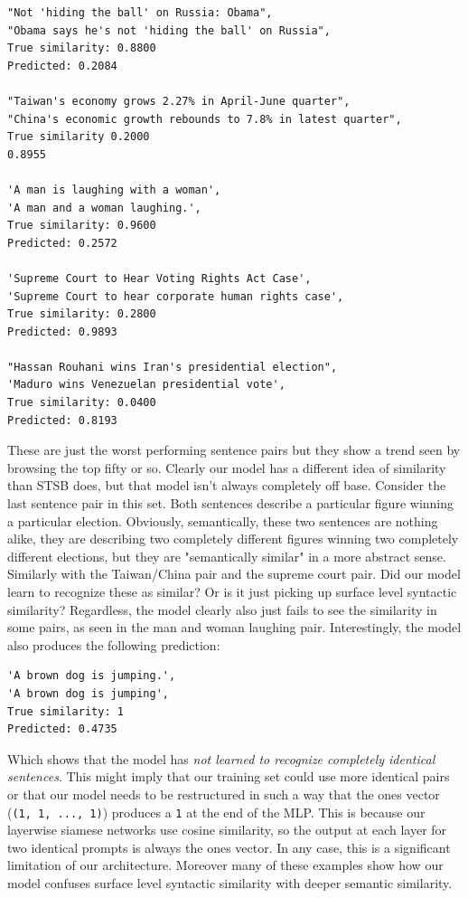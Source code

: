 \documentclass{article}
\begin{document}
\begin{verbatim}
"Not 'hiding the ball' on Russia: Obama",
"Obama says he's not 'hiding the ball' on Russia",
True similarity: 0.8800
Predicted: 0.2084

"Taiwan's economy grows 2.27% in April-June quarter",
"China's economic growth rebounds to 7.8% in latest quarter",
True similarity 0.2000
0.8955

'A man is laughing with a woman',
'A man and a woman laughing.',
True similarity: 0.9600
Predicted: 0.2572

'Supreme Court to Hear Voting Rights Act Case',
'Supreme Court to hear corporate human rights case',
True similarity: 0.2800
Predicted: 0.9893

"Hassan Rouhani wins Iran's presidential election",
'Maduro wins Venezuelan presidential vote',
True similarity: 0.0400
Predicted: 0.8193
\end{verbatim}
These are just the worst performing sentence pairs but they show a trend seen by browsing the top fifty or so. Clearly our model has a different idea of similarity than STSB does, but that model isn't always completely off base. Consider the last sentence pair in this set. Both sentences describe a particular figure winning a particular election. Obviously, semantically, these two sentences are nothing alike, they are describing two completely different figures winning two completely different elections, but they are "semantically similar" in a more abstract sense. Similarly with the Taiwan/China pair and the supreme court pair. Did our model learn to recognize these as similar? Or is it just picking up surface level syntactic similarity? Regardless, the model clearly also just fails to see the similarity in some pairs, as seen in the man and woman laughing pair. Interestingly, the model also produces the following prediction:

\begin{verbatim}
'A brown dog is jumping.',
'A brown dog is jumping',
True similarity: 1
Predicted: 0.4735
\end{verbatim}
Which shows that the model has \textit{not learned to recognize completely identical sentences}. This might imply that our training set could use more identical pairs or that our model needs to be restructured in such a way that the ones vector (\verb|(1, 1, ..., 1)|) produces a \verb|1| at the end of the MLP. This is because our layerwise siamese networks use cosine similarity, so the output at each layer for two identical prompts is always the ones vector. In any case, this is a significant limitation of our architecture. Moreover many of these examples show how our model confuses surface level syntactic similarity with deeper semantic similarity.

\newpage

{}

\end{document}
